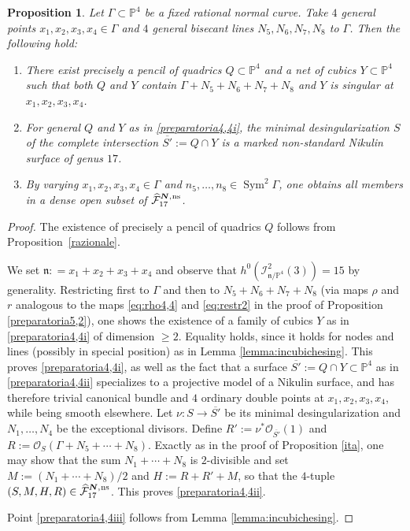 \documentclass[JEP,XML,SOM,Unicode,NoEqCountersInSection,published]{cedram}
\newcommand{\ns}{{\mkern1mu\mathrm{ns}}}
\newcommand{\bN}{\boldsymbol{N}}
\theoremstyle{plain}
\newtheorem{prop}[thm]{Proposition}
\theoremstyle{definition}
\DeclareMathOperator{\Sym}{Sym}
\newcommand\PP{{\mathbb P}}
\newcommand\F{{\mathcal F}}
\begin{document}
\begin{prop}\label{preparatoria4,4}
Let $\Gamma\subset\PP^4$ be a fixed rational normal curve. Take $4$ general points $x_1,x_2,x_3,x_4\in \Gamma$ and $4$ general bisecant lines $N_5,N_6,N_7,N_8$ to $\Gamma$. Then the following hold:
\begin{enumerate}
\item\label{preparatoria4,4i}
There exist precisely a pencil of quadrics $Q \subset\mathbb P^4$ and a net of cubics $Y\subset\mathbb P^4$ such that both $Q$ and $Y$ contain $\Gamma+N_5+N_6+N_7+N_8$ and $Y$ is singular at $x_1,x_2,x_3,x_4$.
\item\label{preparatoria4,4ii}
For general $Q$ and $Y$ as in \eqref{preparatoria4,4i}, the minimal desingularization $S$ of the complete intersection $\overline{S'}:= Q\cap Y$ is a marked non-standard Nikulin surface of genus $17$.
\item\label{preparatoria4,4iii}
By varying $x_1,x_2,x_3,x_4\in \Gamma$ and $n_5,\ldots,n_8\in \Sym^2\Gamma$, one obtains all members in a dense open subset of $\widehat{\F}_{17}^{\bN,\ns}$.
\end{enumerate}
\end{prop}

\begin{proof}
The existence of precisely a pencil of quadrics $Q$ follows from Proposition~\ref{razionale}.

We set $\mathfrak{n}: = x_1 + x_2 + x_3 + x_4$ and observe that $h^0(\mathcal I^2_{\mathfrak{n}/\PP^4}(3))=15$ by generality. Restricting first to $\Gamma$ and then to $N_5+N_6+N_7+N_8$ (via maps $\rho$ and $r$ analogous to the maps \eqref{eq:rho4,4} and \eqref{eq:restr2} in the proof of Proposition \ref{preparatoria5,2}), one shows the existence of a family of cubics $Y$ as in \eqref{preparatoria4,4i} of dimension $\geq 2$. Equality holds, since it holds for nodes and lines (possibly in special position) as in Lemma \ref{lemma:incubichesing}. This proves \eqref{preparatoria4,4i}, as well as the fact that a surface $\overline{S'}:= Q\cap Y\subset \PP^4$ as in \eqref{preparatoria4,4ii} specializes to a projective model of a Nikulin surface, and has therefore trivial canonical bundle and $4$ ordinary double points at $x_1,x_2,x_3,x_4$, while being smooth elsewhere. Let $\nu:S\to \overline{S'}$ be its minimal desingularization and $N_1,\ldots,N_4$ be the exceptional divisors. Define $R':=\nu^*\mathcal O_{\overline{S'}}(1)$ and $R:=\mathcal{O}_{S}(\Gamma+N_5+\cdots+N_8)$. Exactly as in the proof of Proposition \ref{ita}, one may show that the sum $N_1+\cdots +N_8$ is $2$-divisible and set $M:=(N_1+\cdots +N_8)/2$ and $H:=R+R'+M$, so that the $4$-tuple $(S,M,H,R)\in \widehat{\F}_{17}^{\bN,\ns}$.
This proves \eqref{preparatoria4,4ii}.

Point \eqref{preparatoria4,4iii} follows from Lemma \ref{lemma:incubichesing}.
\end{proof}
\end{document}
